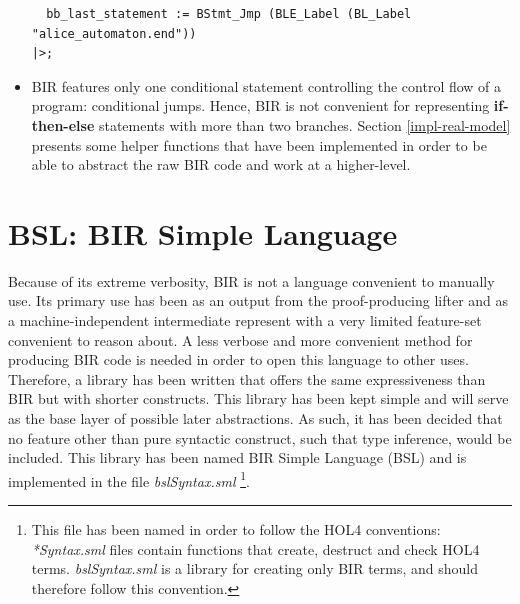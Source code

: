 \documentclass{kththesis}
\begin{document}
\begin{itemize}
\begin{lstlisting}
  bb_last_statement := BStmt_Jmp (BLE_Label (BL_Label "alice_automaton.end"))                                                        
|>;                                                                                                                                  
\end{lstlisting}
    \item BIR features only one conditional statement controlling the control flow of a program: conditional jumps. Hence, BIR is not convenient for representing \textbf{if-then-else} statements with more than two branches. Section \ref{impl-real-model} presents some helper functions that have been implemented in order to be able to abstract the raw BIR code and work at a higher-level.
\end{itemize}


\section{BSL: BIR Simple Language} \label{bsl}

Because of its extreme verbosity, BIR is not a language convenient to manually use. Its primary use has been as an output from the \gls{proof-producing} lifter and as a machine-independent intermediate represent with a very limited feature-set convenient to reason about. A less verbose and more convenient method for producing BIR code is needed in order to open this language to other uses. Therefore, a library has been written that offers the same expressiveness than BIR but with shorter constructs. This library has been kept simple and will serve as the base layer of possible later abstractions. As such, it has been decided that no feature other than pure syntactic construct, such that type inference, would be included. This library has been named BIR Simple Language (BSL) and is implemented in the file \textit{bslSyntax.sml} \footnote{This file has been named in order to follow the HOL4 conventions: \textit{*Syntax.sml} files contain functions that create, destruct and check HOL4 terms. \textit{bslSyntax.sml} is a library for creating only BIR terms, and should therefore follow this convention.}.
\end{document}
